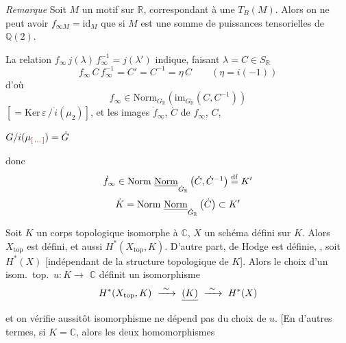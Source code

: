 \documentclass[11pt,a4paper]{article}
\begin{document}
\emph{Remarque} Soit $M$ un motif sur $\mathbb{R}$, 
correspondant à une \struck{\ill{}} \struck{\ill{}} $T_{B}(M)$. Alors on
 ne peut avoir $f_{\infty M} = \mathrm{id}_{M}$ que si $M$ est une
somme de puissances tensorielles de $\mathbb{Q}(2)$.


La relation $f_{\infty}\, j(\lambda)\, f_{\infty}^{-1} = j(\lambda')$
 indique, faisant
$\lambda = C \in S_{\mathbb{R}}$ 
\[
  f_{\infty}\, C\, f_{\infty}^{-1} = C' = C^{-1} = \eta\, C \qquad (\eta = i(-1))
\]
d'où
\[
  f_{\infty} \in \mathrm{Norm}_{G_{\mathbb{R}}}\left(\mathrm{im}_{G_{\mathbb{R}}}(C, C^{-1})\right)
\]
\ill{} $[= \mathrm{Ker}\,\varepsilon\,/\,\dot{i}(\mu_{2})]$, et \ill{} les
images $\dot{f}_{\infty}$, $\dot{C}$ de $f_{\infty}$, $C$,

 $G/i(\mu_{\ill{}}) = \dot{G}$

donc
\[
  \dot{f}_{\infty} \in \mathrm{Norm}\ \struck{\mathrm{Norm}}_{\dot{G}_{\mathbb{R}}}\left(\dot{C}, \dot{C}^{-1}\right) \overset{\mathrm{df}}{=} K'
\]
\[
  \dot{K} = \mathrm{Norm}\ \struck{\mathrm{Norm}}_{\dot{G}_{\mathbb{R}}}\left(\dot{C}\right) \subset K'
\]


\struck{\ill{}}

Soit $K$ un corps topologique  isomorphe à $\mathbb{C}$, $X$ un
schéma  défini  sur $K$. Alors
$X_{\mathrm{top}}$ est défini,  et aussi
$H^{*}(X_{\mathrm{top}}, K)$. \struck{$(\ )$} D'autre part, 
de Hodge est définie, \ill{}, soit $H^{*}(X)$ [indépendant de la structure
topologique \struck{\ill{}} de $K$]. Alors le choix d'un isom.\ top.\
$u : K \to$ \struck{$\to$} $\mathbb{C}$ définit un isomorphisme
\[
  H^{*}(X_{\mathrm{top}}, K) \ \xrightarrow{\ \sim\ }\ \struck{(K)} \ \xrightarrow{\ \sim\ }\ H^{*}(X)
\]
et on vérifie aussitôt   isomorphisme ne dépend
pas du choix de  $u$. [En d'autres termes, si $K = \mathbb{C}$,
alors les \struck{de} deux homomorphismes

\end{document}
